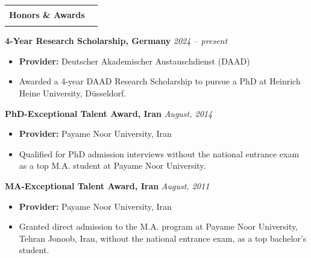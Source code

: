 \documentclass[11pt,a4paper]{article}
\makeatletter
\newcommand{\inlinesection}[1]{%
  \vspace{1em}
  \noindent
  \begin{tabular*}{\linewidth}{@{}l@{\extracolsep{\fill}}r@{}}
    \Large\textbf{\color{darkblue} #1} & \color{darkblue}\rule{0.7\linewidth}{1.2pt} \\
  \end{tabular*}
  \par\vspace{0.7em}
}
\makeatother
\begin{document}
\inlinesection{Honors \& Awards}
\begin{list}{}{
  \setlength{\leftmargin}{0pt}
  \setlength{\labelwidth}{0pt}
  \setlength{\itemindent}{0pt}
  \setlength{\parsep}{0pt}
  \setlength{\itemsep}{1em} %
}
\item \textcolor{RedViolet}{\textbf{4-Year Research Scholarship, Germany} \hfill \textit{2024 – present}} \vspace{0.5em}
      \begin{itemize}
          \item \textbf{Provider:} Deutscher Akademischer Austauschdienst (DAAD) 
      \end{itemize}
      \begin{itemize}
          \item Awarded a 4-year DAAD Research Scholarship to pursue a PhD at Heinrich Heine University, Düsseldorf.
      \end{itemize}
            

\item \textcolor{RedViolet}{\textbf{PhD-Exceptional Talent Award, Iran} \hfill \textit{August, 2014}} \vspace{0.5em}
      \begin{itemize}
          \item \textbf{Provider:} Payame Noor University, Iran 
      \end{itemize}
    \begin{itemize}
        \item Qualified for PhD admission interviews without the national entrance exam as a top M.A. student at Payame Noor University.
    \end{itemize}

    
\item \textcolor{RedViolet}{\textbf{MA-Exceptional Talent Award, Iran} \hfill \textit{August, 2011}} \vspace{0.5em}
      \begin{itemize}
          \item \textbf{Provider:} Payame Noor University, Iran 
      \end{itemize}
      \begin{itemize}
          \item Granted direct admission to the M.A. program at Payame Noor University, Tehran Jonoob, Iran, without the national entrance exam, as a top bachelor’s student.
      \end{itemize}


\end{list}
\end{document}
